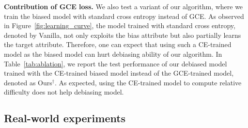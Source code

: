 \begin{table}[t!]
\centering
\caption{
Accuracy evaluated on the unbiased samples and bias-conflicting samples of the Colored MNIST and Corrupted CIFAR-10$^{1, 2}$ dataset for ablation of the proposed algorithm. We denote our algorithm using vanilla model as biased model by Ours$^\dagger$. Best performing results are marked in bold.
}
\label{tab:ablation}
\vspace{-.1in}
\end{table}
 
\textbf{Contribution of GCE loss.}
We also test a variant of our algorithm, where we train the biased model with standard cross entropy instead of GCE. As observed in Figure~\ref{fig:learning_curve}, the model trained with standard cross entropy, denoted by Vanilla, not only exploits the bias attribute but also partially learns the target attribute. Therefore, one can expect that using such a CE-trained model as the biased model can hurt debiasing ability of our algorithm. In Table~\ref{tab:ablation}, we report the test performance of our debiased model trained with the CE-trained biased model instead of the GCE-trained model, denoted as Ours$^\dagger$. As expected, using the CE-trained model to compute relative difficulty does not help debiasing model. 




\subsection{Real-world experiments}

